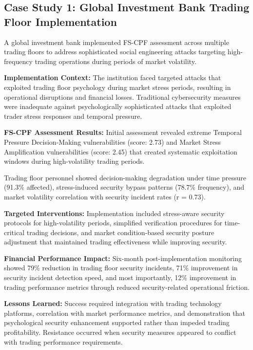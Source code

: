 \documentclass[10pt, twocolumn]{article}
\begin{document}
\subsection{Case Study 1: Global Investment Bank Trading Floor Implementation}

A global investment bank implemented FS-CPF assessment across multiple trading floors to address sophisticated social engineering attacks targeting high-frequency trading operations during periods of market volatility.

\textbf{Implementation Context:} The institution faced targeted attacks that exploited trading floor psychology during market stress periods, resulting in operational disruptions and financial losses. Traditional cybersecurity measures were inadequate against psychologically sophisticated attacks that exploited trader stress responses and temporal pressure.

\textbf{FS-CPF Assessment Results:} Initial assessment revealed extreme Temporal Pressure Decision-Making vulnerabilities (score: 2.73) and Market Stress Amplification vulnerabilities (score: 2.45) that created systematic exploitation windows during high-volatility trading periods.

Trading floor personnel showed decision-making degradation under time pressure (91.3\% affected), stress-induced security bypass patterns (78.7\% frequency), and market volatility correlation with security incident rates (r = 0.73).

\textbf{Targeted Interventions:} Implementation included stress-aware security protocols for high-volatility periods, simplified verification procedures for time-critical trading decisions, and market condition-based security posture adjustment that maintained trading effectiveness while improving security.

\textbf{Financial Performance Impact:} Six-month post-implementation monitoring showed 79\% reduction in trading floor security incidents, 71\% improvement in security incident detection speed, and most importantly, 12\% improvement in trading performance metrics through reduced security-related operational friction.

\textbf{Lessons Learned:} Success required integration with trading technology platforms, correlation with market performance metrics, and demonstration that psychological security enhancement supported rather than impeded trading profitability. Resistance occurred when security measures appeared to conflict with trading performance requirements.
\end{document}
